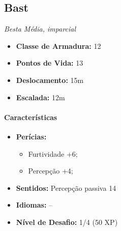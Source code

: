 \documentclass[a4paper,12p]{book}
\begin{document}
\begin{multicols}{2}
		
		
		
		\vfill\null
		\columnbreak


		\subsection{Bast}
		\textit{Besta Média, imparcial}
		
		\begin{itemize}
			\item \textbf{Classe de Armadura:} 12
			\item \textbf{Pontos de Vida:} 13
			\item \textbf{Deslocamento:} 15m
			\item \textbf{Escalada:} 12m
		\end{itemize}
		\begin{center}
		\end{center}
		
		\paragraph{Características}
		
		\begin{itemize}
			
			\item \textbf{Perícias:}
			
			\begin{itemize}
				\item Furtividade +6; 
				\item Percepção +4;
			\end{itemize}
			
			\item \textbf{Sentidos:} Percepção passiva 14
			
			\item \textbf{Idiomas:} –
			
			\item \textbf{Nível de Desafio:} 1/4 (50 XP)
			

\end{itemize}
\end{multicols}
\end{document}
